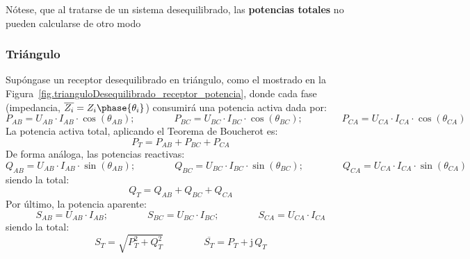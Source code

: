\documentclass[11pt]{book} %
\begin{document}
	\begin{remark}
	    Nótese, que al tratarse de un sistema desequilibrado, las \textbf{potencias totales} no pueden calcularse de otro modo
	\end{remark}
	
	\subsubsection{Triángulo}
	
	Supóngase un receptor desequilibrado en triángulo, como el mostrado en la Figura~\ref{fig.trianguloDesequilibrado_receptor_potencia}, donde cada fase (impedancia, $\overline{Z_i}=Z_i\phase{\theta_i}$) consumirá una potencia activa dada por: 
	\begin{equation*}
	    P_{AB}=U_{AB}\cdot I_{AB} \cdot \cos(\theta_{AB});\qquad \qquad
	    P_{BC}=U_{BC}\cdot I_{BC} \cdot \cos(\theta_{BC});\qquad \qquad
	    P_{CA}=U_{CA}\cdot I_{CA} \cdot \cos(\theta_{CA})
	\end{equation*}
	La potencia activa total, aplicando el Teorema de Boucherot es:
	\begin{equation}
	    \boxed{P_T=P_{AB}+P_{BC}+P_{CA}}
	\end{equation}
	De forma análoga, las potencias reactivas:
	\begin{equation*}
	    Q_{AB}=U_{AB}\cdot I_{AB} \cdot \sin(\theta_{AB});\qquad \qquad
	    Q_{BC}=U_{BC}\cdot I_{BC} \cdot \sin(\theta_{BC});\qquad \qquad
	    Q_{CA}=U_{CA}\cdot I_{CA} \cdot \sin(\theta_{CA})
	\end{equation*}
	siendo la total: 
	\begin{equation}
	    \boxed{Q_T=Q_{AB}+Q_{BC}+Q_{CA}}
	\end{equation}
	Por último, la potencia aparente: 
	\begin{equation*}
	    S_{AB}=U_{AB}\cdot I_{AB};\qquad \qquad
	    S_{BC}=U_{BC}\cdot I_{BC};\qquad \qquad
	    S_{CA}=U_{CA}\cdot I_{CA}
	\end{equation*}
	siendo la total: 
	\begin{equation}
	    \boxed{S_T=\sqrt{P_T^2+Q_T^2}}\,\qquad\qquad \boxed{\overline{S_T}=P_T+\mathrm{j}\,Q_T}
	\end{equation}
	
\end{document}
